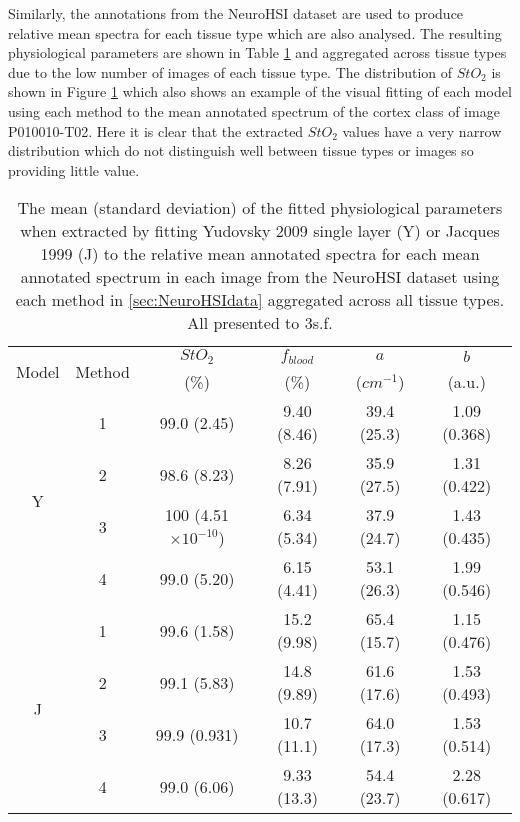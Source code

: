 Similarly, the annotations from the NeuroHSI dataset are used to produce relative mean spectra for each tissue type which are also analysed. The resulting physiological parameters are shown in Table \ref{tb:NHSIann} and aggregated across tissue types due to the low number of images of each tissue type. The distribution of $StO_2$ is shown in Figure \ref{tb:NHSIann} which also shows an example of the visual fitting of each model using each method to the mean annotated spectrum of the cortex class of image P010010-T02. Here it is clear that the extracted $StO_2$ values have a very narrow distribution which do not distinguish well between tissue types or images so providing little value. 

\begin{table}[h!]
    \centering
    \caption{The mean (standard deviation) of the fitted physiological parameters when extracted by fitting Yudovsky 2009 single layer (Y) or Jacques 1999 (J) to the relative mean annotated spectra for each mean annotated spectrum in each image from the NeuroHSI dataset using each method in \ref{sec:NeuroHSIdata} aggregated across all tissue types. All presented to 3s.f.}
    \begin{tabular}{|cc|cccc|}
        \hline
        \multirow{2}{*}{Model} & \multirow{2}{*}{Method} & $StO_2$ & $f_{blood}$ & $a$ & $b$ \\
        & & (\%) & (\%) & ($cm^{-1}$) & (a.u.) \\
        \hline
        \multirow{4}{*}{Y} & 1 & 99.0 (2.45) & 9.40 (8.46) & 39.4 (25.3) & 1.09 (0.368) \\
        & 2 & 98.6 (8.23) & 8.26 (7.91) & 35.9 (27.5) & 1.31 (0.422) \\
        & 3 & 100 (4.51$\times 10^{-10}$) & 6.34 (5.34) & 37.9 (24.7) & 1.43 (0.435) \\
        & 4 & 99.0 (5.20) & 6.15 (4.41) & 53.1 (26.3) & 1.99 (0.546) \\
        \hline
        \multirow{4}{*}{J} & 1 & 99.6 (1.58) & 15.2 (9.98) & 65.4 (15.7) & 1.15 (0.476) \\
        & 2 & 99.1 (5.83) & 14.8 (9.89) & 61.6 (17.6) & 1.53 (0.493) \\
        & 3 & 99.9 (0.931) & 10.7 (11.1) & 64.0 (17.3) & 1.53 (0.514) \\
        & 4 & 99.0 (6.06) & 9.33 (13.3) & 54.4 (23.7) & 2.28 (0.617) \\
        \hline
    \end{tabular}    
    \label{tb:NHSIann}
\end{table}

